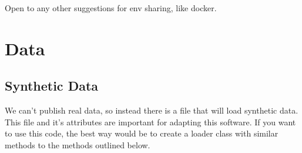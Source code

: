 \documentclass[letterpaper,10pt,english,openany,oneside]{sphinxmanual}
\begin{document}
Open to any other suggestions for env sharing, like docker.


\chapter{Data}
\label{\detokenize{data:data}}\label{\detokenize{data::doc}}

\section{Synthetic Data}
\label{\detokenize{data:synthetic-data}}
We can’t publish real data, so instead there is a file that will load synthetic data. This file and it’s attributes are important for adapting this software. If you want to use this code, the best way would be to create a loader class with similar methods to the methods outlined below.

\label{\detokenize{data:module-datasets.SyntheticData}}
\end{document}

